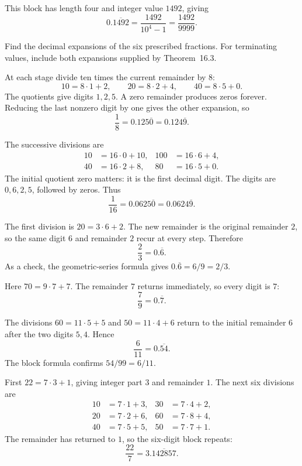 This block has length four and integer value $1492$, giving
\[
 0.\overline{1492}=\frac{1492}{10^4-1}
 =\boxed{\frac{1492}{9999}}.
\]

\goal Find the decimal expansions of the six prescribed fractions.
For terminating values, include both expansions supplied by
Theorem~16.3.

At each stage divide ten times the current remainder by $8$:
\[
 10=8\cdot1+2,\qquad
 20=8\cdot2+4,\qquad
 40=8\cdot5+0.
\]
The quotients give digits $1,2,5$. A zero remainder produces zeros
forever. Reducing the last nonzero digit by one gives the other
expansion, so
\[
 \boxed{\frac18=0.125\overline0=0.124\overline9}.
\]

The successive divisions are
\[
 \begin{aligned}
 10&=16\cdot0+10,&100&=16\cdot6+4,\\
 40&=16\cdot2+8,&80&=16\cdot5+0.
 \end{aligned}
\]
The initial quotient zero matters: it is the first decimal digit.
The digits are $0,6,2,5$, followed by zeros. Thus
\[
 \boxed{\frac1{16}=0.0625\overline0=0.0624\overline9}.
\]

The first division is $20=3\cdot6+2$. The new remainder is the
original remainder $2$, so the same digit $6$ and remainder $2$
recur at every step. Therefore
\[
 \boxed{\frac23=0.\overline6}.
\]
As a check, the geometric-series formula gives
$0.\overline6=6/9=2/3$.

Here $70=9\cdot7+7$. The remainder $7$ returns immediately, so
every digit is $7$:
\[
 \boxed{\frac79=0.\overline7}.
\]

The divisions $60=11\cdot5+5$ and $50=11\cdot4+6$ return to the
initial remainder $6$ after the two digits $5,4$. Hence
\[
 \boxed{\frac6{11}=0.\overline{54}}.
\]
The block formula confirms $54/99=6/11$.

First $22=7\cdot3+1$, giving integer part $3$ and remainder $1$.
The next six divisions are
\[
 \begin{aligned}
 10&=7\cdot1+3,&30&=7\cdot4+2,\\
 20&=7\cdot2+6,&60&=7\cdot8+4,\\
 40&=7\cdot5+5,&50&=7\cdot7+1.
 \end{aligned}
\]
The remainder has returned to $1$, so the six-digit block repeats:
\[
 \boxed{\frac{22}{7}=3.\overline{142857}}.
\]

